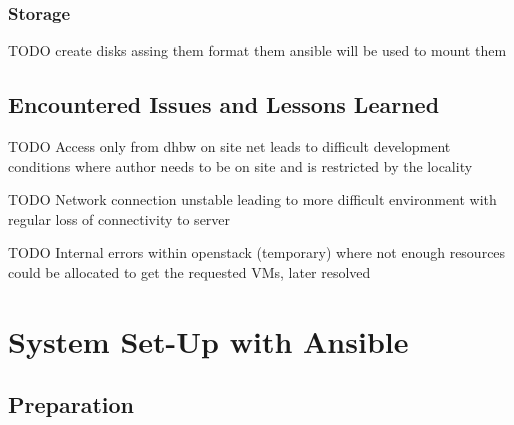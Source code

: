 \begin{table}[hbt]
\centering
{}
	\caption{Available instance sizes in the \ac{DHBW} OpenStack environment}
	\label{fig:instance_sizes}
\end{table}

\subsubsection{Storage}

TODO
create disks
assing them
format them
ansible will be used to mount them

\subsection{Encountered Issues and Lessons Learned}

TODO Access only from dhbw on site net leads to difficult development conditions where author needs to be on site and is restricted by the locality

TODO Network connection unstable leading to more difficult environment with regular loss of connectivity to server

TODO Internal errors within openstack (temporary) where not enough resources could be allocated to get the requested VMs, later resolved


\section{System Set-Up with Ansible}

\subsection{Preparation}


